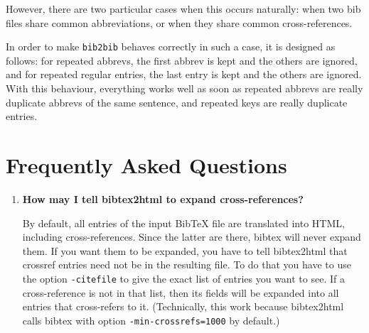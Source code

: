 \documentclass[11pt,a4paper]{article}
\begin{document}
However, there are two particular cases when this occurs naturally:
when two bib files share common abbreviations, or when they share
common cross-references. 

In order to make \verb|bib2bib| behaves correctly in such a case,
it is designed as follows: for repeated abbrevs, the first abbrev is kept and
the others are ignored, and for repeated regular entries, the last entry
is kept and the others are ignored.  With this behaviour, everything
works well as soon as repeated abbrevs are really duplicate abbrevs of
the same sentence, and repeated keys are really duplicate
entries. 

\section{Frequently Asked Questions}

\begin{enumerate}

\item \textbf{How may I tell bibtex2html to expand cross-references?} ~

  By default, all entries of the input BibTeX file are translated into
  HTML, including cross-references. Since the latter are there, bibtex
  will never expand them. If you want them to be expanded, you have to
  tell bibtex2html that crossref entries need not be in the resulting
  file. To do that you have to use the option \verb|-citefile| to give
  the exact list of entries you want to see. If a cross-reference is
  not in that list, then its fields will be expanded into all entries
  that cross-refers to it. (Technically, this work because bibtex2html
  calls bibtex with option \verb|-min-crossrefs=1000| by default.)
  
\end{enumerate}

\end{document}
